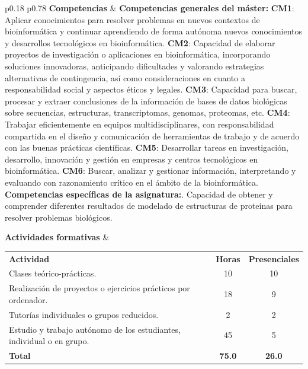 \documentclass[
  11pt,
  a4paper,
  twoside]{scrreprt}
\begin{document}
\begin{longtable}{p{} p{}}
\textbf{Competencias} &
\textbf{Competencias generales del máster:}\newline
\textbf{CM1}: Aplicar conocimientos para resolver problemas en nuevos contextos de bioinformática y continuar aprendiendo de forma autónoma nuevos conocimientos y desarrollos tecnológicos en bioinformática.\newline
\textbf{CM2}: Capacidad de elaborar proyectos de investigación o aplicaciones en bioinformática, incorporando soluciones innovadoras, anticipando dificultades y valorando estrategias alternativas de contingencia, así como consideraciones en cuanto a responsabilidad social y aspectos éticos y legales.\newline
\textbf{CM3}: Capacidad para buscar, procesar y extraer conclusiones de la información de bases de datos biológicas sobre secuencias, estructuras, transcriptomas, genomas, proteomas, etc.\newline
\textbf{CM4}: Trabajar eficientemente en equipos multidisciplinares, con responsabilidad compartida en el diseño y comunicación de herramientas de trabajo y de acuerdo con las buenas prácticas científicas.\newline
\textbf{CM5}: Desarrollar tareas en investigación, desarrollo, innovación y gestión en empresas y centros tecnológicos en bioinformática.\newline
\textbf{CM6}: Buscar, analizar y gestionar información, interpretando y evaluando con razonamiento crítico en el ámbito de la bioinformática.\newline\newline
\textbf{Competencias específicas de la asignatura:}. Capacidad de obtener y comprender diferentes resultados de modelado de estructuras de proteínas para resolver problemas biológicos. \\
\hline

\textbf{Actividades formativas} &
\begin{tabular}[t]{@{}p{}c c@{}}
\textbf{Actividad} & \textbf{Horas} & \textbf{Presenciales} \\
Clases teórico-prácticas. & 10 & 10 \\
Realización de proyectos o ejercicios prácticos por ordenador. & 18 & 9 \\
Tutorías individuales o grupos reducidos. & 2 & 2 \\
Estudio y trabajo autónomo de los estudiantes, individual o en grupo. & 45 & 5 \\
\textbf{Total} & \textbf{75.0} & \textbf{26.0} \\
\end{tabular} \\
\hline


\end{longtable}
\end{document}
